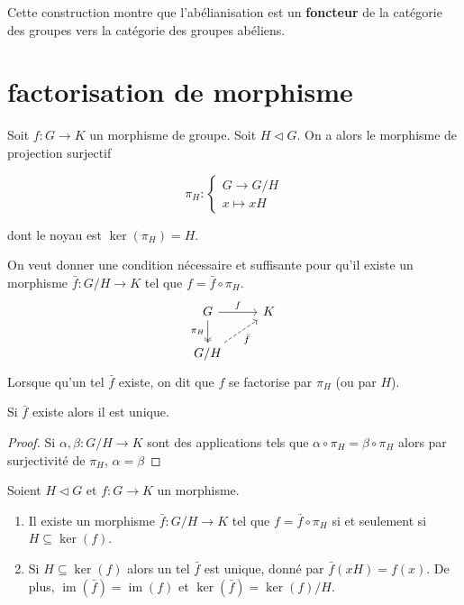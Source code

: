 \noindent Cette construction montre que l'abélianisation est un \textbf{foncteur} de la catégorie des groupes vers la catégorie des groupes abéliens.

\section{factorisation de morphisme}

Soit \( f : G \to K \) un morphisme de groupe.  
Soit \( H \triangleleft G \). On a alors le morphisme de projection surjectif  

\[
\pi_H :  
\begin{cases}  
G \to G/H \\  
x \mapsto xH  
\end{cases}  
\]

dont le noyau est \( \ker(\pi_H) = H \).  

On veut donner une condition nécessaire et suffisante pour qu’il existe un morphisme  
\( \bar{f} : G/H \to K \) tel que \( f = \bar{f} \circ \pi_H \).  
\[
\begin{tikzcd}
    G \arrow[r, "f"] \arrow[d, two heads, "\pi_H"'] & K \\
    G/H \arrow[ru, dashed, "\bar{f}"']
\end{tikzcd}
\]
Lorsque qu’un tel \( \bar{f} \) existe, on dit que \( f \) se factorise par \( \pi_H \) (ou par \( H \)).  

\begin{proposition}
Si $\bar{f}$ existe alors il est unique.
\end{proposition}

\begin{proof}
    Si $\alpha , \beta:G/H \to K$ sont des applications tels que $\alpha\circ\pi_H=\beta\circ\pi_H$ alors par surjectivité de $\pi_H$, $\alpha=\beta$
\end{proof}

 \begin{theoreme}
        Soient $H\triangleleft G$ et $f:G\to K$ un morphisme.
        \begin{enumerate}
            \item Il existe un morphisme \( \bar{f} : G/H \to K \) tel que \( f = \bar{f} \circ \pi_H \) si et seulement si \( H \subseteq \ker(f) \).
            \item Si \( H \subseteq \ker(f) \) alors un tel \( \bar{f} \) est unique, donné par \( \bar{f}(xH) = f(x) \).  
De plus, \( \operatorname{im}(\bar{f}) = \operatorname{im}(f) \) et \( \ker(\bar{f}) = \ker(f)/H \).
        \end{enumerate}
    \end{theoreme}

